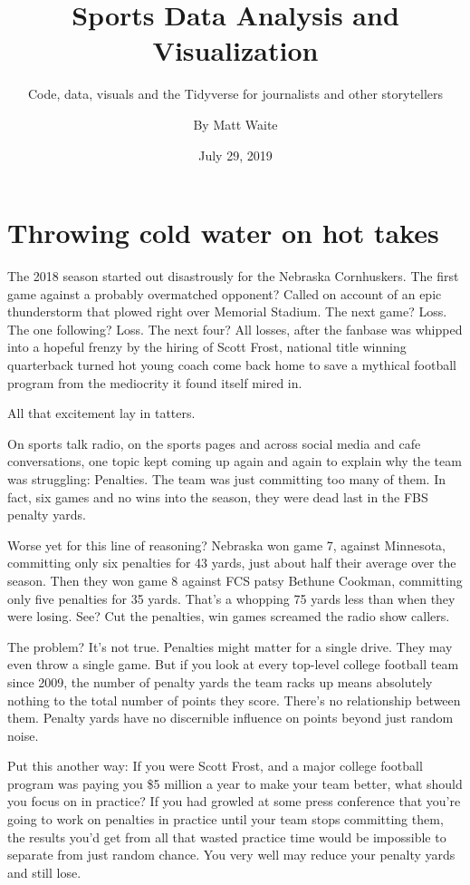 \documentclass[]{book}
\title{Sports Data Analysis and Visualization}
\subtitle{Code, data, visuals and the Tidyverse for journalists and other storytellers}
\author{By Matt Waite}
\date{July 29, 2019}
\begin{document}
\maketitle

{
\setcounter{tocdepth}{1}
\tableofcontents
}
\hypertarget{throwing-cold-water-on-hot-takes}{%
\chapter{Throwing cold water on hot takes}\label{throwing-cold-water-on-hot-takes}}

The 2018 season started out disastrously for the Nebraska Cornhuskers. The first game against a probably overmatched opponent? Called on account of an epic thunderstorm that plowed right over Memorial Stadium. The next game? Loss. The one following? Loss. The next four? All losses, after the fanbase was whipped into a hopeful frenzy by the hiring of Scott Frost, national title winning quarterback turned hot young coach come back home to save a mythical football program from the mediocrity it found itself mired in.

All that excitement lay in tatters.

On sports talk radio, on the sports pages and across social media and cafe conversations, one topic kept coming up again and again to explain why the team was struggling: Penalties. The team was just committing too many of them. In fact, six games and no wins into the season, they were dead last in the FBS penalty yards.

Worse yet for this line of reasoning? Nebraska won game 7, against Minnesota, committing only six penalties for 43 yards, just about half their average over the season. Then they won game 8 against FCS patsy Bethune Cookman, committing only five penalties for 35 yards. That's a whopping 75 yards less than when they were losing. See? Cut the penalties, win games screamed the radio show callers.

The problem? It's not true. Penalties might matter for a single drive. They may even throw a single game. But if you look at every top-level college football team since 2009, the number of penalty yards the team racks up means absolutely nothing to the total number of points they score. There's no relationship between them. Penalty yards have no discernible influence on points beyond just random noise.

Put this another way: If you were Scott Frost, and a major college football program was paying you \$5 million a year to make your team better, what should you focus on in practice? If you had growled at some press conference that you're going to work on penalties in practice until your team stops committing them, the results you'd get from all that wasted practice time would be impossible to separate from just random chance. You very well may reduce your penalty yards and still lose.
\end{document}
